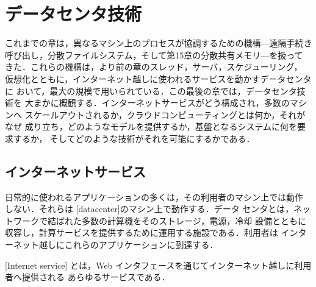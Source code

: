 \documentclass[../main.tex]{subfiles}
\begin{document}
\chapter{データセンタ技術}

これまでの章は，異なるマシン上のプロセスが協調するための機構---遠隔手続き
呼び出し，分散ファイルシステム，そして第15章の分散共有メモリ---を扱って
きた．これらの機構は，より前の章のスレッド，サーバ，スケジューリング，
仮想化とともに，インターネット越しに使われるサービスを動かすデータセンタに
おいて，最大の規模で用いられている．この最後の章では，データセンタ技術を
大まかに概観する．インターネットサービスがどう構成され，多数のマシンへ
スケールアウトされるか，クラウドコンピューティングとは何か，それがなぜ
成り立ち，どのようなモデルを提供するか，基盤となるシステムに何を要求するか，
そしてどのような技術がそれを可能にするかである．

\section{インターネットサービス}
\label{sec:l16-services}

日常的に使われるアプリケーションの多くは，その利用者のマシン上では動作
しない．それらは
[datacenter]のマシン上で動作する．データ
センタとは，ネットワークで結ばれた多数の計算機をそのストレージ，電源，冷却
設備とともに収容し，計算サービスを提供するために運用する施設である．利用者は
インターネット越しにこれらのアプリケーションに到達する．

\begin{definition}[インターネットサービス]
  [Internet service]
  とは，Web インタフェースを通じてインターネット越しに利用者へ提供される
  あらゆるサービスである．
\end{definition}
\end{document}
